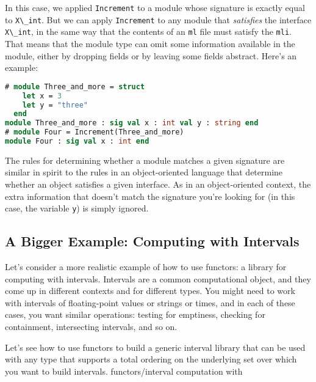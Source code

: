 In this case, we applied \passthrough{\lstinline!Increment!} to a module
whose signature is exactly equal to \passthrough{\lstinline!X\_int!}.
But we can apply \passthrough{\lstinline!Increment!} to any module that
\emph{satisfies} the interface \passthrough{\lstinline!X\_int!}, in the
same way that the contents of an \passthrough{\lstinline!ml!} file must
satisfy the \passthrough{\lstinline!mli!}. That means that the module
type can omit some information available in the module, either by
dropping fields or by leaving some fields abstract. Here's an example:

\begin{lstlisting}[language=Caml]
# module Three_and_more = struct
    let x = 3
    let y = "three"
  end
module Three_and_more : sig val x : int val y : string end
# module Four = Increment(Three_and_more)
module Four : sig val x : int end
\end{lstlisting}

The rules for determining whether a module matches a given signature are
similar in spirit to the rules in an object-oriented language that
determine whether an object satisfies a given interface. As in an
object-oriented context, the extra information that doesn't match the
signature you're looking for (in this case, the variable
\passthrough{\lstinline!y!}) is simply ignored.

\hypertarget{a-bigger-example-computing-with-intervals}{%
\subsection{A Bigger Example: Computing with
Intervals}\label{a-bigger-example-computing-with-intervals}}

Let's consider a more realistic example of how to use functors: a
library for computing with intervals. Intervals are a common
computational object, and they come up in different contexts and for
different types. You might need to work with intervals of floating-point
values or strings or times, and in each of these cases, you want similar
operations: testing for emptiness, checking for containment,
intersecting intervals, and so on.

Let's see how to use functors to build a generic interval library that
can be used with any type that supports a total ordering on the
underlying set over which you want to build intervals.
\protect\hypertarget{FUNCTinterv}{}{functors/interval computation
with}

